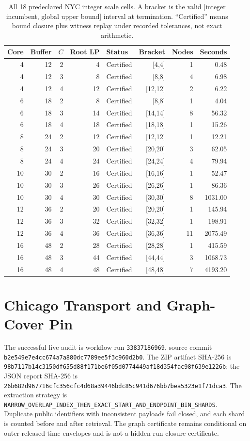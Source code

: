 \begin{table}[t]
\caption{All 18 predeclared NYC integer scale cells. A bracket is the valid
[integer incumbent, global upper bound] interval at termination. ``Certified''
means bound closure plus witness replay under recorded tolerances, not exact arithmetic.}
\label{tab:scaledetail}
\small
\centering
\begin{tabular}{@{}rrrrlrrr@{}}
\toprule
Core & Buffer & $C$ & Root LP & Status & Bracket & Nodes & Seconds \\
\midrule
4  & 12 & 2 & 4  & Certified & [4,4]   & 1 & 0.48 \\
4  & 12 & 3 & 8  & Certified & [8,8]   & 4 & 6.98 \\
4  & 12 & 4 & 12 & Certified & [12,12] & 2 & 6.22 \\
6  & 18 & 2 & 8  & Certified & [8,8]   & 1 & 4.04 \\
6  & 18 & 3 & 14 & Certified & [14,14] & 8 & 56.32 \\
6  & 18 & 4 & 18 & Certified & [18,18] & 1 & 15.26 \\
8  & 24 & 2 & 12 & Certified & [12,12] & 1 & 12.21 \\
8  & 24 & 3 & 20 & Certified & [20,20] & 3 & 62.05 \\
8  & 24 & 4 & 24 & Certified & [24,24] & 4 & 79.94 \\
10 & 30 & 2 & 16 & Certified & [16,16] & 1 & 52.47 \\
10 & 30 & 3 & 26 & Certified & [26,26] & 1 & 86.36 \\
10 & 30 & 4 & 30 & Certified & [30,30] & 8 & 1031.00 \\
12 & 36 & 2 & 20 & Certified & [20,20] & 1 & 145.94 \\
12 & 36 & 3 & 32 & Certified & [32,32] & 1 & 198.91 \\
12 & 36 & 4 & 36 & Certified & [36,36] & 11 & 2075.49 \\
16 & 48 & 2 & 28 & Certified & [28,28] & 1 & 415.59 \\
16 & 48 & 3 & 44 & Certified & [44,44] & 3 & 1068.73 \\
16 & 48 & 4 & 48 & Certified & [48,48] & 7 & 4193.20 \\
\bottomrule
\end{tabular}
\end{table}

\section{Chicago Transport and Graph-Cover Pin}
The successful live audit is workflow run \texttt{33837186969}, source commit
\nolinkurl{b2e549e7e4cc674a7a880dc7789ee5f3c960d2b0}. The ZIP artifact SHA-256 is
\nolinkurl{98b7117b14c3150df655d88f171be6f05d0774449af18d354fac98f639e1226b};
the JSON report SHA-256 is
\nolinkurl{26b682d967716cfc356cfc4d68a39446bdc85c941d676bb7bea5323e1f71dca3}.
The extraction strategy is
\nolinkurl{NARROW_OVERLAP_INDEX_THEN_EXACT_START_AND_ENDPOINT_BIN_SHARDS}.
Duplicate public identifiers with inconsistent payloads fail closed, and each
shard is counted before and after retrieval. The graph certificate remains
conditional on outer released-time envelopes and is not a hidden-run closure
certificate.

